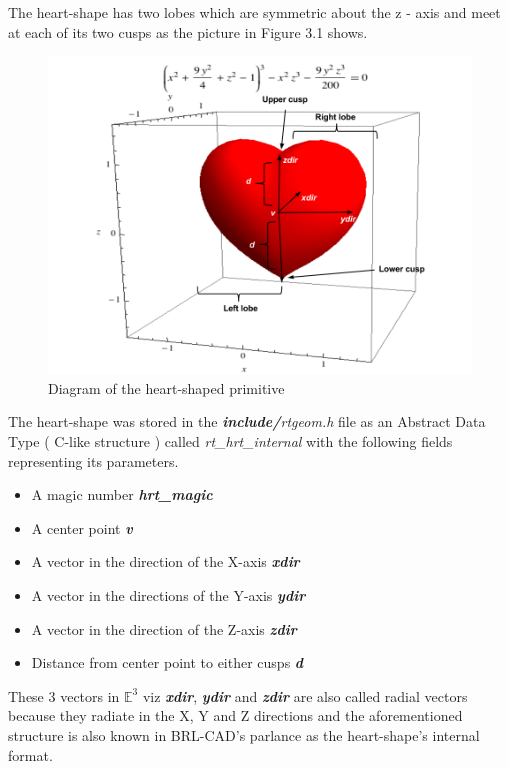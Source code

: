 \hspace{30} The   heart-­shape   has   two   lobes   which   are   symmetric   about   the   z - ­axis   and  
meet at each of its two cusps as the picture in Figure 3.1 shows.  

\begin{figure}[htbp]
\centering
\includegraphics[trim=0.0cm 0.5cm 0.1cm 0.1cm, clip=true, totalheight=0.37\textheight]{Pictures/Heart.png}
\caption[Diagram of the heart-shaped primitive]{Diagram of the heart-shaped primitive}
\label{Heart}
\end{figure}

The   heart-­shape   was   stored   in   the   \textit{\textbf{include/}rtgeom.h}   file   as   an   Abstract   Data  
Type   ( C-­like   structure )   called   \textit{rt\_hrt\_internal}   with   the   following   fields  
representing its parameters.\\

\begin{itemize}  
\item A magic number \textit{\textbf{hrt\_magic }} 
\item A center point \textit{\textbf{v }} 
\item A vector in the direction of the X-­axis \textit{\textbf{xdir}}  
\item A vector in the directions of the Y­-axis \textit{\textbf{ydir}}  
\item A vector in the direction of the Z­-axis \textit{\textbf{zdir}}  
\item Distance from center point to either cusps \textit{\textbf{d}} 
\end{itemize} 
These 3 vectors in $ \mathbb{E}^3 $ viz \textit{\textbf{xdir}}, \textit{\textbf{ydir}} and \textit{\textbf{zdir}}   are   also   called   radial   vectors   because   they   radiate   in   the  X,   Y   and   Z   directions   and   the   aforementioned   structure   is   also   known   in  BRL-­CAD's parlance as the heart-­shape's internal format.

